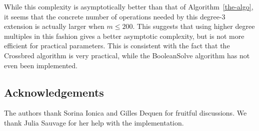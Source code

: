 \documentclass[twoside,leqno]{article}
\begin{document}
While this complexity is asymptotically better than that of
Algorithm~\ref{the-algo}, it seems that the concrete number of operations needed
by this degree-3 extension is actually larger when $m \leq 200$.  This suggests
that using higher degree multiples in this fashion gives a better asymptotic
complexity, but is not more efficient for practical parameters. This is
consistent with the fact that the \textsf{Crossbred} algorithm is very
practical, while the \textsf{BooleanSolve} algorithm has not even been
implemented.

\subsection*{Acknowledgements}

The authors thank Sorina Ionica and Gilles Dequen for fruitful discussions. We thank Julia Sauvage for her help with the implementation. 


\end{document}
